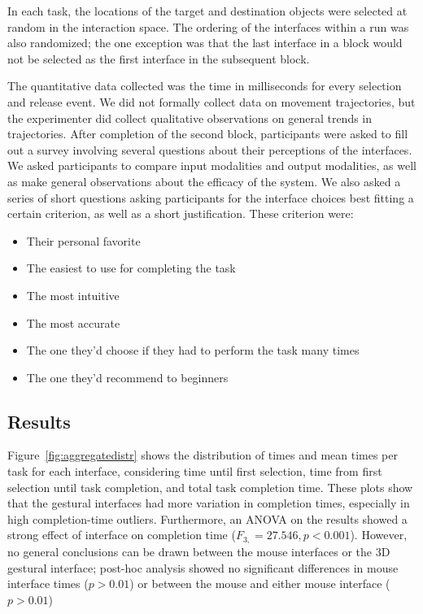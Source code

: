 \documentclass[pageno]{jpaper}
\begin{document}
In each task, the locations of the target and destination objects were selected at random in the interaction space. The
ordering of the interfaces within a run was also randomized; the one exception was that the last interface in a block
would not be selected as the first interface in the subsequent block. 

The quantitative data collected was the time in milliseconds for every selection and release event. We did not formally
collect data on movement trajectories, but the experimenter did collect qualitative observations on general trends in
trajectories. After completion of the second block, participants were asked to fill out a survey involving several questions
about their perceptions of the interfaces. We asked participants to compare input modalities and output modalities, as well as
make general observations about the efficacy of the system. We also asked a series of short questions asking participants for
the interface choices best fitting a certain criterion, as well as a short justification. These criterion were:
\begin{itemize}
\item Their personal favorite
\item The easiest to use for completing the task
\item The most intuitive
\item The most accurate
\item The one they'd choose if they had to perform the task many times
\item The one they'd recommend to beginners
\end{itemize}
\subsection{Results}
Figure~\ref{fig:aggregatedistr} shows the distribution of times and mean times per task for each interface, considering time until first selection, time from first selection until
task completion, and total task completion time. These plots show that the gestural interfaces had more variation in completion times, especially in high completion-time
outliers. Furthermore, an ANOVA on the results showed a strong effect of interface on completion time ($F_{3,}=27.546, p < 0.001$). 
However, no general conclusions can be drawn between the mouse interfaces or the 3D gestural interface; post-hoc analysis showed no significant differences
in mouse interface times ($p > 0.01$) or between the mouse and either mouse interface ($p > 0.01$)
\end{document}

